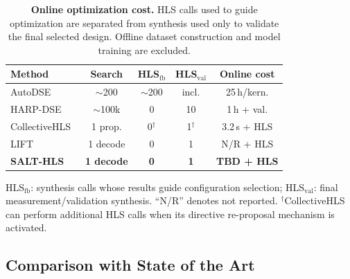 \begin{table}[t]
    \centering
    \caption{\textbf{Online optimization cost.}
    HLS calls used to guide optimization are separated from
    synthesis used only to validate the final selected design.
    Offline dataset construction and model training are excluded.}
    \label{tab:optimization-cost}

    \scriptsize
    \setlength{\tabcolsep}{2.5pt}
    \renewcommand{\arraystretch}{1.08}

    \begin{tabular}{lcccc}
        \toprule
        \textbf{Method} &
        \textbf{Search} &
        \textbf{HLS$_{\mathrm{fb}}$} &
        \textbf{HLS$_{\mathrm{val}}$} &
        \textbf{Online cost} \\
        \midrule

        AutoDSE~\cite{sohrabizadeh2020autodse}
        & $\sim$200
        & $\sim$200
        & incl.
        & 25\,h/kern. \\

        HARP-DSE~\cite{sohrabizadeh2023harp}
        & $\sim$100k
        & 0
        & 10
        & 1\,h + val. \\

        CollectiveHLS~\cite{ferikoglou2024collectivehls}
        & 1 prop.
        & 0$^\dagger$
        & 1$^\dagger$
        & 3.2\,s + HLS \\

        LIFT~\cite{prakriya2025lift}
        & 1 decode
        & 0
        & 1
        & N/R + HLS \\

        \textbf{SALT-HLS}
        & \textbf{1 decode}
        & \textbf{0}
        & \textbf{1}
        & \textbf{TBD + HLS} \\

        \bottomrule
    \end{tabular}

    \vspace{1pt}
    \parbox{0.98\columnwidth}{\scriptsize
    HLS$_{\mathrm{fb}}$: synthesis calls whose results guide
    configuration selection; HLS$_{\mathrm{val}}$: final
    measurement/validation synthesis.
    ``N/R'' denotes not reported.
    $^\dagger$CollectiveHLS can perform additional HLS calls when
    its directive re-proposal mechanism is activated.}
\end{table}


\subsection{Comparison with State of the Art}
\label{subsec:sota-comparison}

